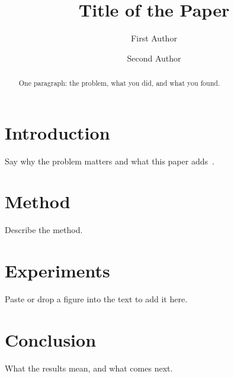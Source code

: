\documentclass[runningheads]{llncs}
\begin{document}
\title{Title of the Paper}

\author{First Author \and
Second Author}


\maketitle

\begin{abstract}
One paragraph: the problem, what you did, and what you found.
\end{abstract}

\section{Introduction}
Say why the problem matters and what this paper adds~\cite{knuth1984}.

\section{Method}
Describe the method.

\section{Experiments}
Paste or drop a figure into the text to add it here.

\section{Conclusion}
What the results mean, and what comes next.



\end{document}
